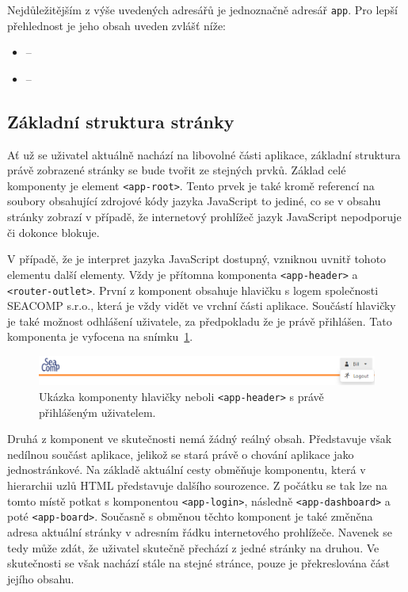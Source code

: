 Nejdůležitějším z výše uvedených adresářů je jednoznačně adresář \texttt{app}. Pro lepší přehlednost je jeho obsah uveden zvlášť níže:

\begin{itemize}
  \item \texttt{} -- 
  \item \texttt{} --
\end{itemize}


\subsection{Základní struktura stránky}
Ať už se uživatel aktuálně nachází na libovolné části aplikace, základní struktura právě zobrazené stránky se bude tvořit ze stejných prvků. Základ celé komponenty je element \texttt{<app-root>}. Tento prvek je také kromě referencí na soubory obsahující zdrojové kódy jazyka JavaScript to jediné, co se v obsahu stránky zobrazí v případě, že internetový prohlížeč jazyk JavaScript nepodporuje či dokonce blokuje. 

V případě, že je interpret jazyka JavaScript dostupný, vzniknou uvnitř tohoto elementu další elementy. Vždy je přítomna komponenta \texttt{<app-header>} a \texttt{<router-outlet>}. První z komponent obsahuje hlavičku s logem společnosti SEACOMP s.r.o., která je vždy vidět ve vrchní části aplikace. Součástí hlavičky je také možnost odhlášení uživatele, za předpokladu že je právě přihlášen. Tato komponenta je vyfocena na snímku~\ref{img:comp-header}.


\begin{figure}[H]
	\centering
	\label{img:comp-header}
	\includegraphics[width=\textwidth]{obrazky-figures/comp-header.png}
	\caption{Ukázka komponenty hlavičky neboli \texttt{<app-header>} s právě přihlášeným uživatelem.}
\end{figure}

Druhá z komponent ve skutečnosti nemá žádný reálný obsah. Představuje však nedílnou součást aplikace, jelikož se stará právě o chování aplikace jako jednostránkové. Na základě aktuální cesty obměňuje komponentu, která v hierarchii uzlů HTML představuje dalšího sourozence. Z počátku se tak lze na tomto místě potkat s komponentou \texttt{<app-login>}, následně \texttt{<app-dashboard>} a poté \texttt{<app-board>}. Současně s obměnou těchto komponent je také změněna adresa aktuální stránky v adresním řádku internetového prohlížeče. Navenek se tedy může zdát, že uživatel skutečně přechází z jedné stránky na druhou. Ve skutečnosti se však nachází stále na stejné stránce, pouze je překreslována část jejího obsahu.

